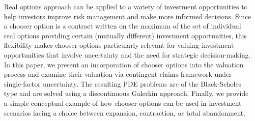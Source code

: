 
\begin{Abstrakt}
    Real options approach can be applied to a variety of investment opportunities to help investors improve risk management and make more informed decisions. Since a chooser option is a contract written on the maximum of the set of individual real options providing certain (mutually different) investment opportunities, this flexibility makes chooser options particularly relevant for valuing investment opportunities that involve uncertainty and the need for strategic decision-making. In this paper, we present an incorporation of chooser options into the valuation process and examine their valuation via contingent claims framework under single-factor uncertainty. The resulting PDE problems are of the Black-Scholes type and are solved using a discontinuous Galerkin approach. Finally, we provide a simple conceptual example of how chooser options can be used in investment scenarios facing a choice between expansion, contraction, or total abandonment.
\end{Abstrakt}



\clearpage